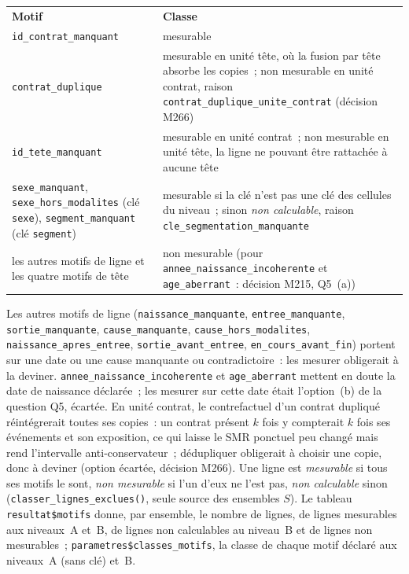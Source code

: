\documentclass[a4paper,11pt]{article}
\newcommand{\code}[1]{\texttt{\small #1}}
\begin{document}
{\begin{center}
\small
{}
\begin{tabular}{@{}p{5.6cm}p{9.0cm}@{}}
\rowcolor{tableheader}
\textcolor{financeblue}{\textbf{Motif}} &
\textcolor{financeblue}{\textbf{Classe}} \\
\code{id\_contrat\_manquant} & mesurable \\
\code{contrat\_duplique} & mesurable en unité tête, où la fusion par tête absorbe les copies~; non mesurable en unité contrat, raison \code{contrat\_duplique\_unite\_contrat} (décision M266) \\
\code{id\_tete\_manquant} & mesurable en unité contrat~; non mesurable en unité tête, la ligne ne pouvant être rattachée à aucune tête \\
\code{sexe\_manquant}, \code{sexe\_hors\_modalites} (clé \code{sexe}), \code{segment\_manquant} (clé \code{segment}) & mesurable si la clé n'est pas une clé des cellules du niveau~; sinon \emph{non calculable}, raison \code{cle\_segmentation\_manquante} \\
les autres motifs de ligne et les quatre motifs de tête & non mesurable (pour \code{annee\_naissance\_incoherente} et \code{age\_aberrant}~: décision M215, Q5~(a)) \\
\end{tabular}
\end{center}

\noindent
Les autres motifs de ligne (\code{naissance\_manquante},
\code{entree\_manquante}, \code{sortie\_manquante}, \code{cause\_manquante},
\code{cause\_hors\_modalites}, \code{naissance\_apres\_entree},
\code{sortie\_avant\_entree}, \code{en\_cours\_avant\_fin}) portent sur une
date ou une cause manquante ou contradictoire~: les mesurer obligerait à la
deviner. \code{annee\_naissance\_incoherente} et \code{age\_aberrant} mettent
en doute la date de naissance déclarée~; les mesurer sur cette date était
l'option~(b) de la question Q5, écartée. En unité contrat, le contrefactuel
d'un contrat dupliqué réintégrerait toutes ses copies~: un contrat présent
$k$ fois y compterait $k$ fois ses événements et son exposition, ce qui
laisse le SMR ponctuel peu changé mais rend l'intervalle anti-conservateur~;
dédupliquer obligerait à choisir une copie, donc à deviner (option
écartée, décision M266). Une ligne est \emph{mesurable} si tous ses motifs le
sont, \emph{non mesurable} si l'un d'eux ne l'est pas, \emph{non calculable}
sinon (\code{classer\_lignes\_exclues()}, seule source des ensembles $S$).
Le tableau \code{resultat\$motifs} donne, par ensemble, le nombre de lignes,
de lignes mesurables aux niveaux~A et~B, de lignes non calculables au
niveau~B et de lignes non mesurables~; \code{parametres\$classes\_motifs},
la classe de chaque motif déclaré aux niveaux~A (sans clé) et~B.

}
\end{document}
